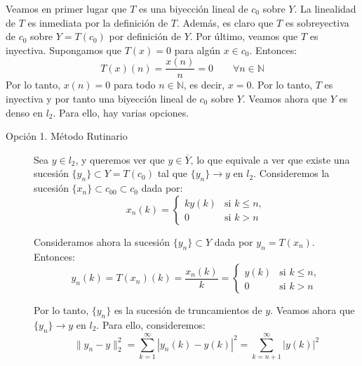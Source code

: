 \documentclass[12pt]{article}
\begin{document}
\begin{ejercicio}[2 puntos]
\begin{enumerate}[label=\alph*)]
            Veamos en primer lugar que $T$ es una biyección lineal de $c_0$ sobre $Y$. La linealidad de $T$ es inmediata por la definición de $T$. Además, es claro que $T$ es sobreyectiva de $c_0$ sobre $Y=T(c_0)$ por definición de $Y$. Por último, veamos que $T$ es inyectiva. Supongamos que $T(x)=0$ para algún $x\in c_0$. Entonces:
            \begin{equation*}
                T(x)(n) = \frac{x(n)}{n} = 0 \qquad \forall n\in \mathbb{N}
            \end{equation*}
            Por lo tanto, $x(n) = 0$ para todo $n\in \mathbb{N}$, es decir, $x=0$. Por lo tanto, $T$ es inyectiva y por tanto una biyección lineal de $c_0$ sobre $Y$. Veamos ahora que $Y$ es denso en $l_2$. Para ello, hay varias opciones.
            \begin{description}
                \item[Opción 1. Método Rutinario] Sea $y\in l_2$, y queremos ver que $y\in \overline{Y}$, lo que equivale a ver que existe una sucesión $\{y_n\}\subset Y=T(c_0)$ tal que $\{y_n\}\to y$ en $l_2$. Consideremos la sucesión $\{x_n\}\subset c_{00}\subset c_0$ dada por:
                \begin{equation*}
                    x_n(k) = \begin{cases}
                        k y(k) & \text{si } k\leq n, \\
                        0 & \text{si } k>n
                    \end{cases}
                \end{equation*}
                
                Consideramos ahora la sucesión $\{y_n\}\subset Y$ dada por $y_n = T(x_n)$. Entonces:
                \begin{equation*}
                    y_n(k) = T(x_n)(k) = \frac{x_n(k)}{k} = \begin{cases}
                        y(k) & \text{si } k\leq n, \\
                        0 & \text{si } k>n
                    \end{cases}
                \end{equation*}

                Por lo tanto, $\{y_n\}$ es la sucesión de truncamientos de $y$. Veamos ahora que $\{y_n\}\to y$ en $l_2$. Para ello, consideremos:
                \begin{equation*}
                    \|y_n - y\|_2^2 = \sum_{k=1}^{\infty} |y_n(k) - y(k)|^2 = \sum_{k=n+1}^{\infty} |y(k)|^2
                \end{equation*}


\end{description}
\end{enumerate}
\end{ejercicio}
\end{document}
